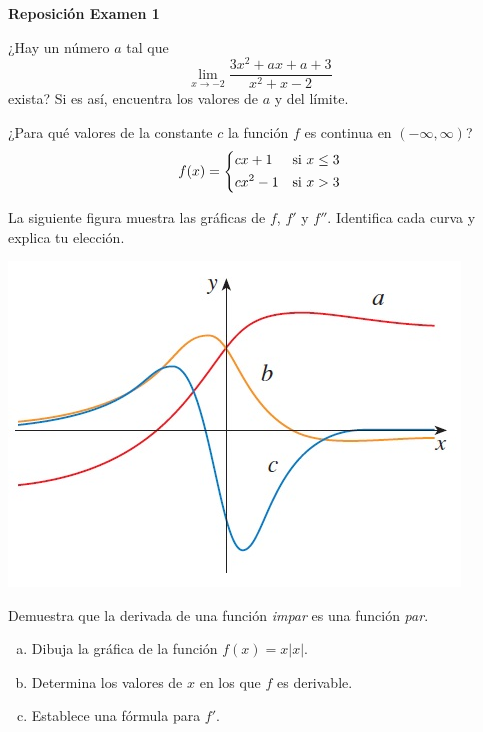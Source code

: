 \documentclass[12pt]{exam}
\begin{document}
\begin{center}
\Large 
\textbf{Reposición Examen 1}
\end{center}{}
\normalsize



\pointformat{\bfseries\boldmath(\thepoints)}
\vskip10pt

\begin{questions}

\question 
¿Hay un número $a$ tal que $$\lim\limits_{x \to -2}\dfrac{3x^2+ax+a+3}{x^2+x-2}$$ exista? Si es así, encuentra los valores de $a$ y del límite. 
\vskip10pt

 \question ¿Para qué valores de la constante $c$ la función $f$ es continua en $(-\infty,\infty)$?
 $$f(x) = \begin{dcases} cx+1 & \text{si } x \leq 3 \\ cx^2-1 & \text{si } x > 3 \end{dcases}$$
 \vskip10pt

   \question La siguiente figura muestra las gráficas de $f$, $f'$ y $f''$. Identifica cada curva y explica tu elección. 
   \begin{center}
  \includegraphics[scale=1]{curvas derivada.jpg}     
   \end{center}

\question Demuestra que la derivada de una función \textit{impar} es una función \textit{par}.
 \vskip10pt
\question 
\begin{enumerate}[a)]
    \item Dibuja la gráfica de la función $f(x)=x|x|$.
    \item Determina los valores de $x$ en los que $f$ es derivable.
    \item Establece una fórmula para $f'$.
\end{enumerate}

\end{questions}
\end{document}
